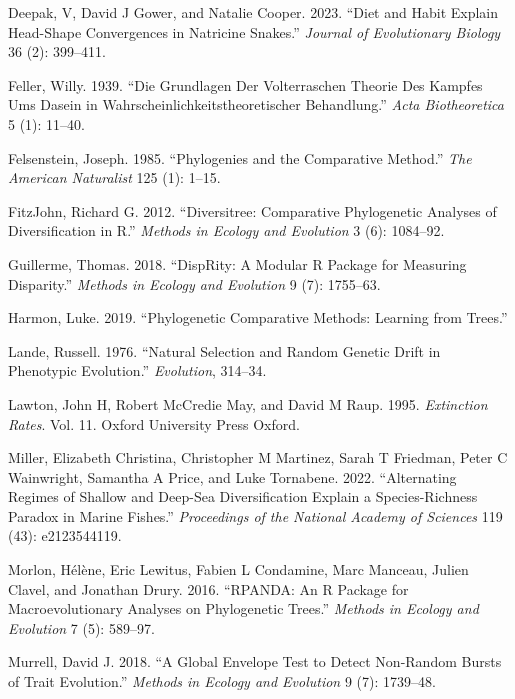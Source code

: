 \documentclass[
]{article}
\newlength{\cslhangindent}
\newenvironment{cslreferences}%
  {\setlength{\parindent}{0pt}%
  \everypar{\setlength{\hangindent}{\cslhangindent}}\ignorespaces}%
  {\par}
\begin{document}
\begin{cslreferences}
\leavevmode\hypertarget{ref-deepak2023diet}{}%
Deepak, V, David J Gower, and Natalie Cooper. 2023. ``Diet and Habit
Explain Head-Shape Convergences in Natricine Snakes.'' \emph{Journal of
Evolutionary Biology} 36 (2): 399--411.

\leavevmode\hypertarget{ref-feller1939birthdeath}{}%
Feller, Willy. 1939. ``Die Grundlagen Der Volterraschen Theorie Des
Kampfes Ums Dasein in Wahrscheinlichkeitstheoretischer Behandlung.''
\emph{Acta Biotheoretica} 5 (1): 11--40.

\leavevmode\hypertarget{ref-felsensteinPCM}{}%
Felsenstein, Joseph. 1985. ``Phylogenies and the Comparative Method.''
\emph{The American Naturalist} 125 (1): 1--15.

\leavevmode\hypertarget{ref-diversitree}{}%
FitzJohn, Richard G. 2012. ``Diversitree: Comparative Phylogenetic
Analyses of Diversification in R.'' \emph{Methods in Ecology and
Evolution} 3 (6): 1084--92.

\leavevmode\hypertarget{ref-dispRity}{}%
Guillerme, Thomas. 2018. ``DispRity: A Modular R Package for Measuring
Disparity.'' \emph{Methods in Ecology and Evolution} 9 (7): 1755--63.

\leavevmode\hypertarget{ref-harmon2019book}{}%
Harmon, Luke. 2019. ``Phylogenetic Comparative Methods: Learning from
Trees.''

\leavevmode\hypertarget{ref-lande1976OU}{}%
Lande, Russell. 1976. ``Natural Selection and Random Genetic Drift in
Phenotypic Evolution.'' \emph{Evolution}, 314--34.

\leavevmode\hypertarget{ref-lawton1995extinction}{}%
Lawton, John H, Robert McCredie May, and David M Raup. 1995.
\emph{Extinction Rates}. Vol. 11. Oxford University Press Oxford.

\leavevmode\hypertarget{ref-miller2022alternating}{}%
Miller, Elizabeth Christina, Christopher M Martinez, Sarah T Friedman,
Peter C Wainwright, Samantha A Price, and Luke Tornabene. 2022.
``Alternating Regimes of Shallow and Deep-Sea Diversification Explain a
Species-Richness Paradox in Marine Fishes.'' \emph{Proceedings of the
National Academy of Sciences} 119 (43): e2123544119.

\leavevmode\hypertarget{ref-rpanda}{}%
Morlon, Hélène, Eric Lewitus, Fabien L Condamine, Marc Manceau, Julien
Clavel, and Jonathan Drury. 2016. ``RPANDA: An R Package for
Macroevolutionary Analyses on Phylogenetic Trees.'' \emph{Methods in
Ecology and Evolution} 7 (5): 589--97.

\leavevmode\hypertarget{ref-murrell2018global}{}%
Murrell, David J. 2018. ``A Global Envelope Test to Detect Non-Random
Bursts of Trait Evolution.'' \emph{Methods in Ecology and Evolution} 9
(7): 1739--48.


\end{cslreferences}
\end{document}
